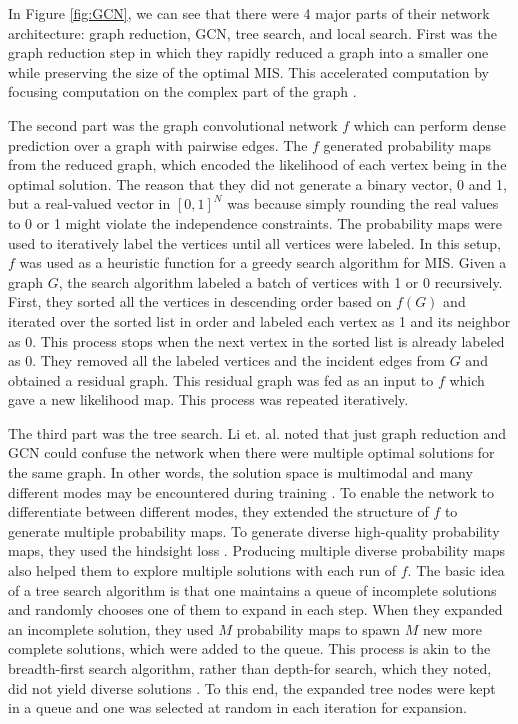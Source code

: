 \documentclass{article}
\begin{document}
In Figure \ref{fig:GCN}, we can see that there were 4 major parts of their network architecture: graph reduction, GCN, tree search, and local search. First was the graph reduction step in which they rapidly reduced a graph into a smaller one while preserving the size of the optimal MIS. This accelerated computation by focusing computation on the complex part of the graph \cite{li2018combinatorial}.

The second part was the graph convolutional network \cite{karp1972reducibility} $f$ which can perform dense prediction over a graph with pairwise edges. The $f$ generated probability maps from the reduced graph, which encoded the likelihood of each vertex being in the optimal solution. The reason that they did not generate a binary vector, 0 and 1, but a real-valued vector in $[0, 1]^N$ was because simply rounding the real values to 0 or 1 might violate the independence constraints. The probability maps were used to iteratively label the vertices until all vertices were labeled. In this setup, $f$ was used as a heuristic function for a greedy search algorithm for MIS. Given a graph $G$, the search algorithm labeled a batch of vertices with 1 or 0 recursively. First, they sorted all the vertices in descending order based on $f(G)$ and iterated over the sorted list in order and labeled each vertex as 1 and its neighbor as 0. This process stops when the next vertex in the sorted list is already labeled as 0. They removed all the labeled vertices and the incident edges from $G$ and obtained a residual graph. This residual graph was fed as an input to $f$ which gave a new likelihood map. This process was repeated iteratively. 

The third part was the tree search. Li et. al. noted that just graph reduction and GCN could confuse the network when there were multiple optimal solutions for the same graph. In other words, the solution space is multimodal and many different modes may be encountered during training \cite{li2018combinatorial}. To enable the network to differentiate between different modes, they extended the structure of $f$ to generate multiple probability maps. To generate diverse high-quality probability maps, they used the hindsight loss \cite{li2018combinatorial}. Producing multiple diverse probability maps also helped them to explore multiple solutions with each run of $f$. The basic idea of a tree search algorithm is that one maintains a queue of incomplete solutions and randomly chooses one of them to expand in each step. When they expanded an incomplete solution, they used $M$ probability maps to spawn $M$ new more complete solutions, which were added to the queue. This process is akin to the breadth-first search algorithm, rather than depth-for search, which they noted, did not yield diverse solutions \cite{li2018combinatorial}. To this end, the expanded tree nodes were kept in a queue and one was selected at random in each iteration for expansion.  
\end{document}
